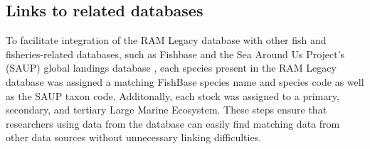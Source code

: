 \documentclass[letterpaper,12pt]{article}
\begin{document}
\subsection{ Links to related databases}
To facilitate integration of the RAM Legacy database with other fish
and fisheries-related databases, such as Fishbase
\citep{Froese:Pauly:2009:fishbase} and the Sea Around Us Project's
(SAUP) global landings database \citep{Watson:etal:2005:fandf}, each species present in the RAM
Legacy database was assigned a matching FishBase species name and
species code as well as the SAUP taxon code. Additonally, each stock
was assigned to a primary, secondary, and tertiary Large Marine
Ecosystem. These steps ensure that researchers using data from the
database can easily find matching data from other data sources without
unnecessary linking difficulties.
\begin{comment}
\newpage
\section{Results}

Available data (note coverage and biases in this section) In total,
recent stock assessments for XX (?) marine fish and XX invertebrate
populations are included in the RAM Legacy database (Version 1.0,
2010). These include all stocks assessed by federal agencies in the
U.S. (National Marine Fisheries Service (NMFS), n=XX), Canada
(Department of Fisheries and Oceans (DFO), n=XX), New Zealand (NIWA
and ??, n=xx), by Regional Fisheries Management Organizations (RFMOs)
in the Northwest Atlantic (Northwest Atlantic Fisheries Organization
(NAF0), n=XX), Atlantic (International Commission for the Conservation
of Atlantic Tunas (ICCAT), n=XX), .... In addition, a subset of stocks

-distinction in assessments: do they exist and we have just not entered them? or do they not exist?

num of marine fish populations for there are stock assessments:

-taxonomic coverage (family, species), trophic level (and/or pelagic, demersal.....), habitat, diversity, ....   Assessed populations are from XX different species and XX families, thus comprising a small fraction of marine fish biodiversity.  Figure~\ref{fig:taxo}

-out of all diversity
Compare taxonomically and geographically to world fisheries catches....
number of the top 10 (or top 100) fisheries for which there are stock assessments (number of these that are for marine fishes vs. marine invertebrates) 


\end{comment}
\end{document}
